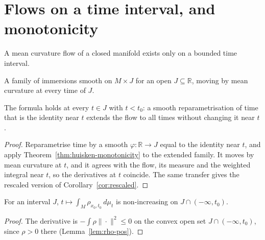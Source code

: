 \section{Flows on a time interval, and monotonicity}

A mean curvature flow of a closed manifold exists only on a bounded time interval.

\begin{definition}
  \label{def:flow-on}
  \leanok
  A family of immersions smooth on $M \times J$ for an open $J \subseteq \mathbb{R}$, moving
  by mean curvature at every time of $J$.
\end{definition}

\begin{theorem}
  \label{thm:huisken-interval}
  \leanok
  The formula holds at every $t \in J$ with $t < t_0$: a smooth reparametrisation of time
  that is the identity near $t$ extends the flow to all times without changing it near $t$.
\end{theorem}

\begin{proof}
  \leanok
  Reparametrise time by a smooth $\varphi \colon \mathbb{R} \to J$ equal to the identity near $t$, and apply Theorem~\ref{thm:huisken-monotonicity} to the extended family. It moves by mean curvature at $t$, and it agrees with the flow, its measure and the weighted integral near $t$, so the derivatives at $t$ coincide. The same transfer gives the rescaled version of Corollary~\ref{cor:rescaled}.
\end{proof}

\begin{corollary}[monotonicity]
  \label{cor:antitone}
  \leanok
  For an interval $J$, $t \mapsto \int_M \rho_{x_0,t_0}\,d\mu_t$ is non-increasing on
  $J \cap (-\infty, t_0)$.
\end{corollary}

\begin{proof}
  \leanok
  The derivative is $-\int \rho \|\cdot\|^2 \le 0$ on the convex open set $J \cap (-\infty, t_0)$, since $\rho > 0$ there (Lemma~\ref{lem:rho-pos}).
\end{proof}

